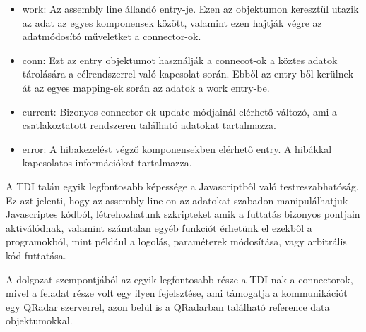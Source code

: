 \begin{itemize}
	\item work: Az assembly line állandó entry-je. Ezen az objektumon keresztül utazik az adat az egyes komponensek között, valamint ezen hajtják végre az adatmódosító műveletket a connector-ok.
	\item conn: Ezt az entry objektumot használják a connecot-ok a köztes adatok tárolására a célrendszerrel való kapcsolat során. Ebből az entry-ből kerülnek át az egyes mapping-ek során az adatok a work entry-be.
	\item current: Bizonyos connector-ok update módjainál elérhető változó, ami a csatlakoztatott rendszeren található adatokat tartalmazza.
	\item error: A hibakezelést végző komponensekben elérhető entry. A hibákkal kapcsolatos információkat tartalmazza.
\end{itemize}

A TDI talán egyik legfontosabb képessége a Javascriptből való testreszabhatóság. Ez azt jelenti, hogy az assembly line-on az adatokat szabadon manipulálhatjuk Javascriptes kódból, létrehozhatunk szkripteket amik a futtatás bizonyos pontjain aktiválódnak, valamint számtalan egyéb funkciót érhetünk el ezekből a programokból, mint például a logolás, paraméterek módosítása, vagy arbitrális kód futtatása.

A dolgozat szempontjából az egyik legfontosabb része a TDI-nak a connectorok, mivel a feladat része volt egy ilyen fejelsztése, ami támogatja a kommunikációt egy QRadar szerverrel, azon belül is a QRadarban található reference data objektumokkal.
